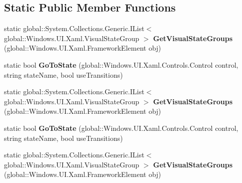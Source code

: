 \subsection*{Static Public Member Functions}
\begin{DoxyCompactItemize}
\item 
\mbox{\label{class_windows_1_1_u_i_1_1_xaml_1_1_visual_state_manager_a350961a3e264abb0e6a192dee36c3c2d}} 
static global\+::\+System.\+Collections.\+Generic.\+I\+List$<$ global\+::\+Windows.\+U\+I.\+Xaml.\+Visual\+State\+Group $>$ {\bfseries Get\+Visual\+State\+Groups} (global\+::\+Windows.\+U\+I.\+Xaml.\+Framework\+Element obj)
\item 
\mbox{\label{class_windows_1_1_u_i_1_1_xaml_1_1_visual_state_manager_a5e1fb7fe58054bc7166b1f7cb0656de4}} 
static bool {\bfseries Go\+To\+State} (global\+::\+Windows.\+U\+I.\+Xaml.\+Controls.\+Control control, string state\+Name, bool use\+Transitions)
\item 
\mbox{\label{class_windows_1_1_u_i_1_1_xaml_1_1_visual_state_manager_a350961a3e264abb0e6a192dee36c3c2d}} 
static global\+::\+System.\+Collections.\+Generic.\+I\+List$<$ global\+::\+Windows.\+U\+I.\+Xaml.\+Visual\+State\+Group $>$ {\bfseries Get\+Visual\+State\+Groups} (global\+::\+Windows.\+U\+I.\+Xaml.\+Framework\+Element obj)
\item 
\mbox{\label{class_windows_1_1_u_i_1_1_xaml_1_1_visual_state_manager_a5e1fb7fe58054bc7166b1f7cb0656de4}} 
static bool {\bfseries Go\+To\+State} (global\+::\+Windows.\+U\+I.\+Xaml.\+Controls.\+Control control, string state\+Name, bool use\+Transitions)
\item 
\mbox{\label{class_windows_1_1_u_i_1_1_xaml_1_1_visual_state_manager_a350961a3e264abb0e6a192dee36c3c2d}} 
static global\+::\+System.\+Collections.\+Generic.\+I\+List$<$ global\+::\+Windows.\+U\+I.\+Xaml.\+Visual\+State\+Group $>$ {\bfseries Get\+Visual\+State\+Groups} (global\+::\+Windows.\+U\+I.\+Xaml.\+Framework\+Element obj)
\item 
\mbox{\label{class_windows_1_1_u_i_1_1_xaml_1_1_visual_state_manager_a5e1fb7fe58054bc7166b1f7cb0656de4}} 

\end{DoxyCompactItemize}
